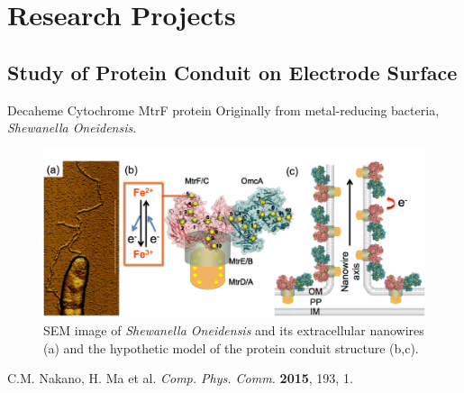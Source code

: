 \documentclass{beamer}
\begin{document}
\section{Research Projects}
\subsection{Study of Protein Conduit on Electrode Surface}
\begin{frame}{Decaheme Cytochrome MtrF protein } 
	Originally from metal-reducing bacteria, \emph{Shewanella Oneidensis}. 
	\begin{figure}
		\includegraphics[width=\linewidth]{Pics/MtrF.png}
		\caption{SEM image of \emph{Shewanella Oneidensis} and its extracellular nanowires (a) and the hypothetic model of the protein conduit structure (b,c). }
	\end{figure} 
	\hfill {\tiny C.M. Nakano, H. Ma et al. \emph{Comp. Phys. Comm.} \textbf{2015}, 193, 1.
	}
\end{frame}
\end{document}
